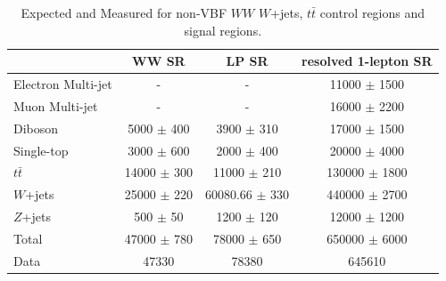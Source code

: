 \begin{table}
\begin{tabular}{|l|c|c|c|}
\hline
	  &	 WW SR &	 LP SR &	resolved 1-lepton SR \\\hline 
	Electron Multi-jet &	- &	- &	11000 $\pm$ 1500 \\\hline 
	Muon Multi-jet &	- &	- &	16000 $\pm$ 2200 \\\hline 
	Diboson &	5000 $\pm$ 400 &	3900 $\pm$ 310 &	17000 $\pm$ 1500 \\\hline 
	Single-top &	3000 $\pm$ 600 &	2000 $\pm$ 400 &	20000 $\pm$ 4000 \\\hline 
	$t\bar{t}$ &	14000 $\pm$ 300 &	11000 $\pm$ 210&	130000 $\pm$ 1800 \\\hline 
	$W$+jets &	25000 $\pm$ 220 &	60080.66 $\pm$ 330 &	440000 $\pm$ 2700 \\\hline 
	$Z$+jets &	500 $\pm$ 50 &	1200 $\pm$ 120 &	12000 $\pm$ 1200 \\\hline 
	Total &	47000 $\pm$ 780 &	78000 $\pm$ 650 &	650000 $\pm$ 6000 \\\hline 
	Data &	47330 &	78380 &	645610 \\\hline 
\end{tabular}
\caption{Expected and Measured for non-VBF $WW$ $W$+jets, $t\bar{t}$ control regions and signal regions.}
\label{tbl:hvtww_yields}
\end{table}

